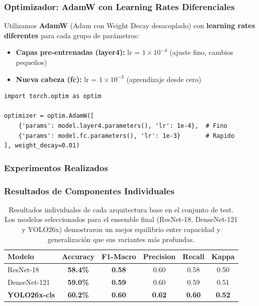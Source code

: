 \documentclass[12pt,a4paper]{article}
\begin{document}
\subsubsection{Optimizador: AdamW con Learning Rates Diferenciales}

Utilizamos \textbf{AdamW} (Adam con Weight Decay desacoplado) con \textbf{learning rates diferentes} para cada grupo de parámetros:

\begin{itemize}
    \item \textbf{Capas pre-entrenadas (layer4):} lr = $1 \times 10^{-4}$ (ajuste fino, cambios pequeños)
    \item \textbf{Nueva cabeza (fc):} lr = $1 \times 10^{-3}$ (aprendizaje desde cero)
\end{itemize}

\begin{lstlisting}[caption={Configuración del optimizador con LR diferencial}]
import torch.optim as optim

optimizer = optim.AdamW([
    {'params': model.layer4.parameters(), 'lr': 1e-4},  # Fino
    {'params': model.fc.parameters(), 'lr': 1e-3}       # Rapido
], weight_decay=0.01)
\end{lstlisting}

\subsubsection{Experimentos Realizados}%

\subsubsection{Resultados de Componentes Individuales}

\begin{table}[H]
\centering
\begin{tabular}{lccccc}
\toprule
\textbf{Modelo} & \textbf{Accuracy} & \textbf{F1-Macro} & \textbf{Precision} & \textbf{Recall} & \textbf{Kappa} \\
\midrule
\rowcolor{green!10} ResNet-18 & \textbf{58.4\%} & \textbf{0.58} & 0.60 & 0.58 & 0.50 \\
\rowcolor{green!10} DenseNet-121 & \textbf{59.0\%} & \textbf{0.59} & 0.60 & 0.59 & 0.51 \\
\textbf{YOLO26x-cls} & \textbf{60.2\%} & \textbf{0.60} & \textbf{0.62} & \textbf{0.60} & \textbf{0.52} \\
\bottomrule
\end{tabular}
\caption{Resultados individuales de cada arquitectura base en el conjunto de test. Los modelos seleccionados para el ensemble final (ResNet-18, DenseNet-121 y YOLO26x) demostraron un mejor equilibrio entre capacidad y generalización que sus variantes más profundas.}
\label{tab:resultados_individuales}
\end{table}
\end{document}
